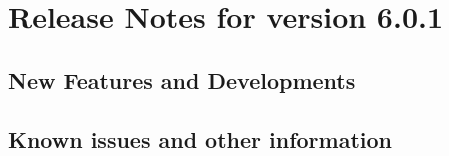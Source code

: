 \section{Release Notes for \app{} version 6.0.1}

\subsection{New Features and Developments}


\subsection{Known issues and other information}

